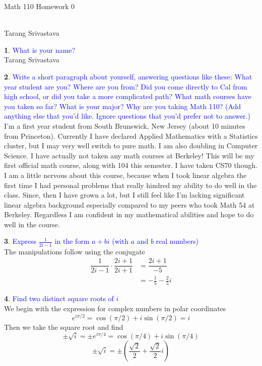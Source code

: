 \documentclass[10pt, twocolumn]{article}
\author{Tarang Srivastava}
\newcommand{\makechaptertitle}[1]{
\begin{center}
	\begin{large}
		#1
	\end{large}
	\begin{small}
		\\Tarang Srivastava
	\end{small}
\end{center}
}
\newcommand{\question}[1]{\textcolor{blue}{#1} \\}
\theoremstyle{definition}
\newtheorem{q}{}
\begin{document}
\makechaptertitle{Math 110 Homework 0}

\begin{q}
    \question{What is your name?}
     Tarang Srivastava
\end{q}
\begin{q}
    \question{
        Write a short paragraph  about  yourself,  answering  questions  like  these:  What  year student are you?  Where are you from?  Did you come directly to Cal from high school, or did you take a more complicated path?  What math courses have you taken so far?  What is your major?  Why are you taking Math 110?  (Add anything else that you’d like.  Ignore questions that you’d prefer not to answer.) 
    }    
    I'm a first year student from South Brunswick, New Jersey (about 10 minutes from Princeton).
    Currently I have declared Applied Mathematics with a Statistics cluster, but I may very well switch to pure math.
    I am also doubling in Computer Science.
    I have actually not taken any math courses at Berkeley! This will be my first official math course, along with 104 this semester.
    I have taken CS70 though.
    I am a little nervous about this course, because when I took linear algebra the first time I had personal problems that really hindred my ability to do well in the class. 
    Since, then I have grown a lot, but I still feel like I'm lacking significant linear algebra background especially compared to my peers who took Math 54 at Berkeley. Regardless I am confident in my mathematical abilities and hope to do well in the course.
\end{q}
\begin{q}
    \question{Express $\frac{1}{2i -1}$ in the form $ a + bi $ (with $ a $ and $ b $ real numbers)}
    The manipulations follow using the conjugate
    \begin{align*}
        \dfrac{1}{2i -1} \cdot \dfrac{2i + 1}{2i + 1} &= \dfrac{2i + 1}{-5}\\ 
        &= -\frac{1}{5} -\frac{2}{5}i
    \end{align*}
\end{q}
\begin{q}
    \question{Find two distinct square roots of $ i $}
    We begin with the expression for complex numbers in polar coordinates
    $$ e^{i\pi/2} = \cos(\pi/2) + i \sin(\pi/2) = i $$
    Then we take the square root and find 
    $$ \pm \sqrt{i} = \pm e^{i\pi/4} = \cos(\pi/4) + i \sin(\pi/4)$$
    $$ \pm \sqrt{i} = \pm \left(\frac{\sqrt{2}}{2} + \frac{\sqrt{2}}{2} i \right)$$
\end{q}
\end{document}
